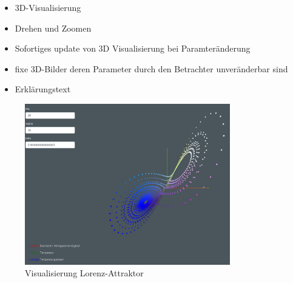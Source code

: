 \begin{itemize}
	\item 3D-Visualisierung
	\item Drehen und Zoomen
	\item Sofortiges update von 3D Visualisierung bei Paramteränderung
	\item fixe 3D-Bilder deren Parameter durch den Betrachter unveränderbar sind
	\item Erklärungstext
\end{itemize}

\begin{figure}
	\centering	\includegraphics[height=7cm]{lorenz/assets/implementation/Visualisierung}
	\caption{Visualisierung Lorenz-Attraktor}
	\label{fig:visualisierung}
\end{figure}
